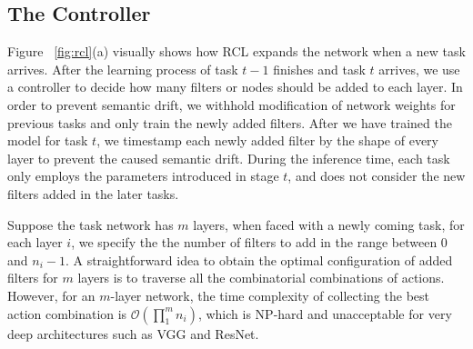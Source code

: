 \documentclass{article}
\begin{document}
\subsection{The Controller}
Figure ~\ref{fig:rcl}(a) visually shows how RCL expands the network when a new task arrives. After the learning process of task $t-1$ finishes and task $t$ arrives, we use a controller to decide how many filters or nodes should be added to each layer. In order to prevent semantic drift, we withhold modification of network weights for previous tasks and only train the newly added filters. After we have trained the model for task $t$, we timestamp each newly added filter by the shape of every layer to prevent the caused semantic drift. During the inference time, each task only employs the parameters introduced in stage $t$,  and does not consider the new filters added in the later tasks.


Suppose the task network has $m$ layers, when faced with a newly coming task, for each layer $i$, we specify the the number of filters to add in the range between $0$ and $n_i-1$. A straightforward idea to obtain the optimal configuration of added filters for  $m$ layers  is to traverse all the  combinatorial combinations of actions. However, for an $m$-layer network, the time complexity of collecting the best action combination is $\mathcal{O}(\prod_1^m n_i)$, which is NP-hard and unacceptable for very deep architectures such as VGG and ResNet. 
\end{document}
